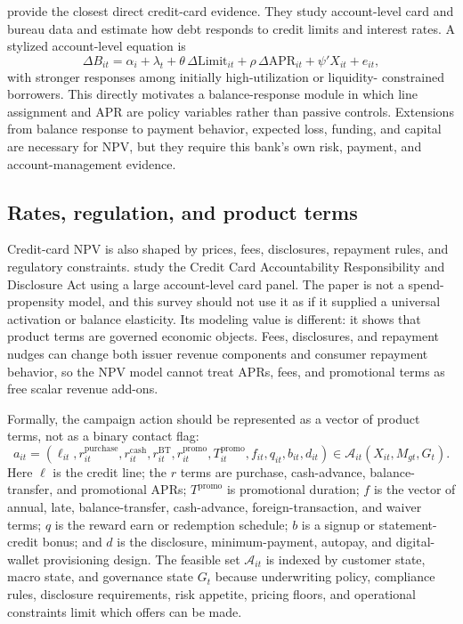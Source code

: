 \documentclass[11pt]{article}
\newcommand{\1}{\mathbf{1}}
\begin{document}
\citet{gross2001liquidity} provide the closest direct credit-card evidence.
They study account-level card and bureau data and estimate how debt responds to
credit limits and interest rates. A stylized account-level equation is
\begin{equation}
  \Delta B_{it}
  =
  \alpha_i + \lambda_t
  + \theta\,\Delta \mathrm{Limit}_{it}
  + \rho\,\Delta \mathrm{APR}_{it}
  + \psi' X_{it}
  + e_{it},
  \label{eq:limit-apr-response}
\end{equation}
with stronger responses among initially high-utilization or liquidity-
constrained borrowers. This directly motivates a balance-response module in
which line assignment and APR are policy variables rather than passive
controls. Extensions from balance response to payment behavior, expected loss,
funding, and capital are necessary for NPV, but they require this bank's own
risk, payment, and account-management evidence.

\subsection{Rates, regulation, and product terms}

Credit-card NPV is also shaped by prices, fees, disclosures, repayment rules,
and regulatory constraints. \citet{agarwal2013cardact} study the Credit Card
Accountability Responsibility and Disclosure Act using a large account-level
card panel. The paper is not a spend-propensity model, and this survey should
not use it as if it supplied a universal activation or balance elasticity. Its
modeling value is different: it shows that product terms are governed economic
objects. Fees, disclosures, and repayment nudges can change both issuer revenue
components and consumer repayment behavior, so the NPV model cannot treat APRs,
fees, and promotional terms as free scalar revenue add-ons.

Formally, the campaign action should be represented as a vector of product
terms, not as a binary contact flag:
\begin{equation}
  a_{it}
  =
  \left(
    \ell_{it}, r^{\mathrm{purchase}}_{it},
    r^{\mathrm{cash}}_{it}, r^{\mathrm{BT}}_{it},
    r^{\mathrm{promo}}_{it}, T^{\mathrm{promo}}_{it},
    f_{it}, q_{it}, b_{it}, d_{it}
  \right)
  \in \mathcal{A}_{it}(X_{it},M_{gt},G_t).
  \label{eq:offer-vector}
\end{equation}
Here $\ell$ is the credit line; the $r$ terms are purchase, cash-advance,
balance-transfer, and promotional APRs; $T^{\mathrm{promo}}$ is promotional
duration; $f$ is the vector of annual, late, balance-transfer, cash-advance,
foreign-transaction, and waiver terms; $q$ is the reward earn or redemption
schedule; $b$ is a signup or statement-credit bonus; and $d$ is the disclosure,
minimum-payment, autopay, and digital-wallet provisioning design. The feasible
set $\mathcal{A}_{it}$ is indexed by customer state, macro state, and governance
state $G_t$ because underwriting policy, compliance rules, disclosure
requirements, risk appetite, pricing floors, and operational constraints limit
which offers can be made.
\end{document}
